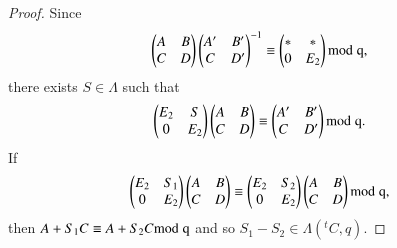 \begin{proof}
Since\pageoriginale
$$
\begin{pmatrix}
A & B\\
C & D
\end{pmatrix}
\begin{pmatrix}
A' & B'\\
C & D'
\end{pmatrix}^{-1}
\equiv 
\begin{pmatrix}
\ast & \ast\\
0 & E_{2}
\end{pmatrix}
\rm{mod} \; q,
$$
there exists $S\in\Lambda$ such that
$$
\begin{pmatrix}
E_{2} & S\\
0 & E_{2}
\end{pmatrix}
\begin{pmatrix}
A & B\\
C & D
\end{pmatrix}
\equiv
\begin{pmatrix}
A' & B'\\
C & D'
\end{pmatrix}
\rm{mod} \; q.
$$
If
$$
\begin{pmatrix}
E_{2} & S_{1}\\
0 & E_{2}
\end{pmatrix}
\begin{pmatrix}
A & B\\
C & D
\end{pmatrix}
\equiv 
\begin{pmatrix}
E_{2} & S_{2}\\
0 & E_{2}
\end{pmatrix}
\begin{pmatrix}
A & B\\
C & D
\end{pmatrix}
\rm{mod} \; q,
$$
then $A+S_{1}C\equiv A+S_{2}C\rm{mod} \; q$ and so
$S_{1}-S_{2}\in\Lambda({}^{t}C,q)$.
\end{proof}

